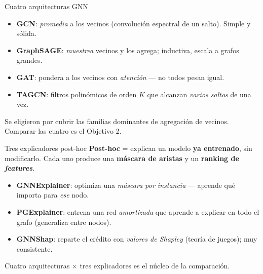 \documentclass[aspectratio=169,11pt]{beamer}
\begin{document}
\begin{frame}{Cuatro arquitecturas GNN}
\begin{itemize}
  \item \textbf{\color{navy}GCN}: \emph{promedia} a los vecinos (convolución espectral de un salto). Simple y sólida.
  \item \textbf{\color{navy}GraphSAGE}: \emph{muestrea} vecinos y los agrega; inductiva, escala a grafos grandes.
  \item \textbf{\color{navy}GAT}: pondera a los vecinos con \emph{atención} --- no todos pesan igual.
  \item \textbf{\color{navy}TAGCN}: filtros polinómicos de orden $K$ que alcanzan \emph{varios saltos} de una vez.
\end{itemize}
\vspace{0.5em}
{\footnotesize\color{muted} Se eligieron por cubrir las familias dominantes de agregación de vecinos. Comparar las cuatro es el Objetivo 2.}
\end{frame}

\begin{frame}{Tres explicadores post-hoc}
{\footnotesize \textbf{Post-hoc} = explican un modelo \textbf{ya entrenado}, sin modificarlo. Cada uno produce una \textbf{máscara de aristas} y un \textbf{ranking de \emph{features}}.}
\vspace{0.5em}
\begin{itemize}
  \item \textbf{\color{navy}GNNExplainer}: optimiza una \emph{máscara por instancia} --- aprende qué importa para \emph{ese} nodo.
  \item \textbf{\color{navy}PGExplainer}: entrena una red \emph{amortizada} que aprende a explicar en todo el grafo (generaliza entre nodos).
  \item \textbf{\color{navy}GNNShap}: reparte el crédito con \emph{valores de Shapley} (teoría de juegos); muy consistente.
\end{itemize}
\vspace{0.4em}
{\footnotesize\color{muted} Cuatro arquitecturas $\times$ tres explicadores es el núcleo de la comparación.}
\end{frame}
\end{document}
